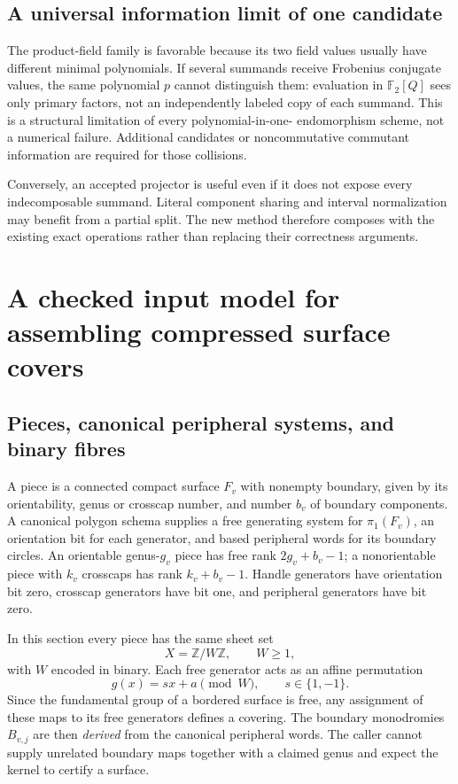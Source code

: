 \documentclass[11pt,a4paper]{article}
\theoremstyle{definition}\newtheorem{definition}[theorem]{Definition}
\theoremstyle{remark}\newtheorem{remark}[theorem]{Remark}
\newcommand{\F}{\mathbb F_2}
\newcommand{\Z}{\mathbb Z}
\begin{document}
\subsection{A universal information limit of one candidate}

The product-field family is favorable because its two field values usually
have different minimal polynomials. If several summands receive Frobenius
conjugate values, the same polynomial $p$ cannot distinguish them: evaluation
in $\F[Q]$ sees only primary factors, not an independently labeled copy of
each summand. This is a structural limitation of every polynomial-in-one-
endomorphism scheme, not a numerical failure. Additional candidates or
noncommutative commutant information are required for those collisions.

Conversely, an accepted projector is useful even if it does not expose every
indecomposable summand. Literal component sharing and interval normalization
may benefit from a partial split. The new method therefore composes with the
existing exact operations rather than replacing their correctness arguments.

\section{A checked input model for assembling compressed surface covers}
\label{sec:seam-input}

\subsection{Pieces, canonical peripheral systems, and binary fibres}

A piece is a connected compact surface $F_v$ with nonempty boundary, given by
its orientability, genus or crosscap number, and number $b_v$ of boundary
components. A canonical polygon schema supplies a free generating system
for $\pi_1(F_v)$, an orientation bit for each generator, and based peripheral
words for its boundary circles. An orientable genus-$g_v$ piece has free rank
$2g_v+b_v-1$; a nonorientable piece with $k_v$ crosscaps has rank
$k_v+b_v-1$. Handle generators have orientation bit zero, crosscap generators
have bit one, and peripheral generators have bit zero.

In this section every piece has the same sheet set
\[
 X=\Z/W\Z,\qquad W\ge1,
\]
with $W$ encoded in binary. Each free generator acts as an affine permutation
\begin{equation}\label{eq:affine}
 g(x)=s x+a\pmod W,\qquad s\in\{1,-1\}.
\end{equation}
Since the fundamental group of a bordered surface is free, any assignment
of these maps to its free generators defines a covering. The boundary
monodromies $B_{v,j}$ are then \emph{derived} from the canonical peripheral
words. The caller cannot supply unrelated boundary maps together with a
claimed genus and expect the kernel to certify a surface.
\end{document}
